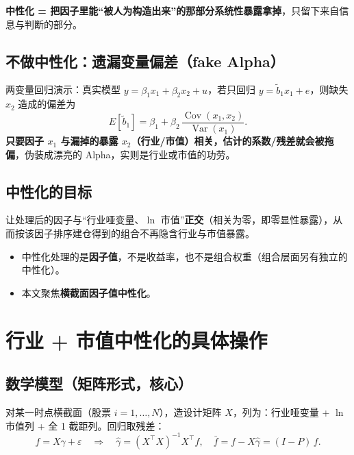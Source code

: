 \documentclass[UTF8,11pt]{ctexart}
\begin{document}
\textbf{中性化 = 把因子里能“被人为构造出来”的那部分系统性暴露拿掉}，只留下来自信息与判断的部分。

\subsection{不做中性化：遗漏变量偏差（fake Alpha）}
两变量回归演示：真实模型 $y=\beta_1 x_1+\beta_2 x_2+u$，若只回归 $y=\tilde b_1 x_1+e$，则缺失 $x_2$ 造成的偏差为
\begin{equation}
E[\tilde b_1] = \beta_1 + \beta_2\,\frac{\operatorname{Cov}(x_1,x_2)}{\operatorname{Var}(x_1)}.
\end{equation}
\textbf{只要因子 $x_1$ 与漏掉的暴露 $x_2$（行业/市值）相关，估计的系数/残差就会被拖偏}，伪装成漂亮的 Alpha，实则是行业或市值的功劳。

\subsection{中性化的目标}
让处理后的因子与“行业哑变量、$\ln$ 市值”\textbf{正交}（相关为零，即零显性暴露），从而按该因子排序建仓得到的组合不再隐含行业与市值暴露。

\begin{itemize}[itemsep=2pt]
\item 中性化处理的是\textbf{因子值}，不是收益率，也不是组合权重（组合层面另有独立的中性化）。
\item 本文聚焦\textbf{横截面因子值中性化}。
\end{itemize}

\section{行业 + 市值中性化的具体操作}

\subsection{数学模型（矩阵形式，核心）}
对某一时点横截面（股票 $i=1,\dots,N$），造设计矩阵 $X$，列为：行业哑变量 + $\ln$市值列 + 全 1 截距列。回归取残差：
\begin{equation}
f = X\gamma + \varepsilon
\quad\Rightarrow\quad
\hat\gamma=(X^{\top}X)^{-1}X^{\top}f,\quad
\bar f = f-X\hat\gamma = (I-P)\,f.
\end{equation}
\end{document}
